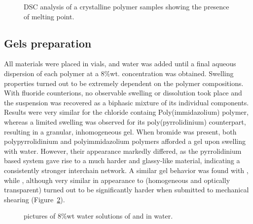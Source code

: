 \documentclass[journal=jacsat,manuscript=article]{achemso}
\begin{document}
\begin{figure}
\caption{DSC analysis of a crystalline polymer samples showing the presence of melting point.}
\label{fig:dsc}
\end{figure}

\subsection{Gels preparation}
All materials were placed in vials, and water was added until a final aqueous dispersion of each polymer at a 8\%wt. concentration was obtained. Swelling properties turned out to be extremely dependent on the polymer compositions. With fluoride counterions, no observable swelling or dissolution took place and the suspension was recovered as a biphasic mixture of its individual components. Results were very similar for the chloride containg Poly(immidazolium) polymer, whereas a limited swelling was observed for its poly(pyrrolidinium) counterpart, resulting in a granular, inhomogeneous gel. When bromide was present, both polypyrrolidinium and polyimmidazolium polymers afforded a gel upon swelling with water. However, their appearance markedly differed, as the pyrrolidinium based system gave rise to a much harder and glassy-like material, indicating a consistently stronger interchain network. A similar gel behavior was found with , while , although very similar in appearance to  (homogeneous and optically transparent) turned out to be significantly harder when submitted to mechanical shearing (Figure~\ref{fig:pictures}).

\begin{figure}
\caption{pictures of 8\%wt water solutions of  and  in water.}
\label{fig:pictures}
\end{figure}
\end{document}
